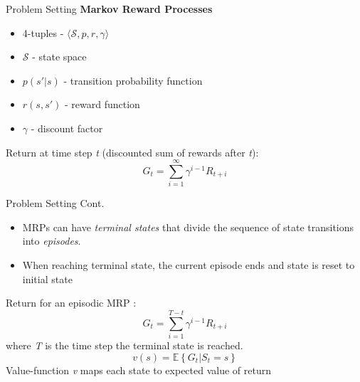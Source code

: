 \documentclass[xcolor={table}]{beamer}
\begin{document}
\begin{frame}{Problem Setting}
    \textbf{Markov Reward Processes}
    \begin{itemize}
        \item 4-tuples - $\langle\mathcal{S},p,r,\gamma\rangle$
        \item $\mathcal{S}$ - state space
        \item $p(s'|s)$ - transition probability function
        \item $r(s,s')$ - reward function
        \item $\gamma$ - discount factor %
    \end{itemize}
    Return at time step \textit{t} (discounted sum of rewards after \textit{t}):
    \begin{equation*}
        G_{t} = \sum_{i=1}^{\infty } \gamma^{i-1}R_{t+i}
    \end{equation*}
\end{frame}

\begin{frame}{Problem Setting Cont.}
    \begin{itemize}
        \item MRPs can have \textit{terminal states} that divide the sequence of state transitions into \textit{episodes}.
        \item When reaching terminal state, the current episode ends and state is reset to initial state
    \end{itemize}
    Return for an episodic MRP :
    \begin{equation*}
        G_{t} = \sum_{i=1}^{T-t } \gamma^{i-1}R_{t+i}
    \end{equation*}
    where \textit{T} is the time step the terminal state is reached.
    \begin{equation*}
        v(s) = \mathbb{E}\left \{ G_{t} | S_{t} = s \right \}
    \end{equation*}
    Value-function \textit{v} maps each state to expected value of return
\end{frame}
\end{document}
